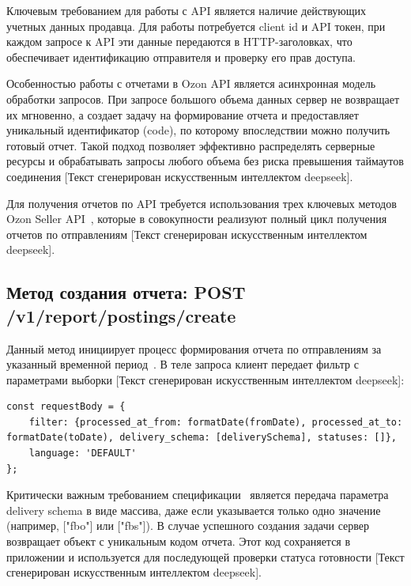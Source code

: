 Ключевым требованием для работы с API является наличие действующих учетных данных продавца. Для работы потребуется client id и API токен, при каждом запросе к API эти данные передаются в HTTP-заголовках, что обеспечивает идентификацию отправителя и проверку его прав доступа.

Особенностью работы с отчетами в Ozon API является асинхронная модель обработки запросов. При запросе большого объема данных сервер не возвращает их мгновенно, а создает задачу на формирование отчета и предоставляет уникальный идентификатор (code), по которому впоследствии можно получить готовый отчет. Такой подход позволяет эффективно распределять серверные ресурсы и обрабатывать запросы любого объема без риска превышения таймаутов соединения [Текст сгенерирован искусственным интеллектом deepseek].

Для получения отчетов по API требуется использования трех ключевых методов Ozon Seller API~\cite{ozonSellerAPI}, которые в совокупности реализуют полный цикл получения отчетов по отправлениям [Текст сгенерирован искусственным интеллектом deepseek].

\subsection{Метод создания отчета: POST /v1/report/postings/create}

Данный метод инициирует процесс формирования отчета по отправлениям за указанный временной период~\cite{ozonSellerAPI}. В теле запроса клиент передает фильтр с параметрами выборки [Текст сгенерирован искусственным интеллектом deepseek]:

\begin{code}
\label{code:filter}
\vspace{-0.75cm}\begin{verbatim}
const requestBody = {
    filter: {processed_at_from: formatDate(fromDate), processed_at_to: formatDate(toDate), delivery_schema: [deliverySchema], statuses: []},
    language: 'DEFAULT'
};
\end{verbatim}
\end{code}

Критически важным требованием спецификации~\cite{ozonSellerAPI} является передача параметра delivery schema в виде массива, даже если указывается только одно значение (например, ["fbo"] или ["fbs"]). В случае успешного создания задачи сервер возвращает объект с уникальным кодом отчета. Этот код сохраняется в приложении и используется для последующей проверки статуса готовности [Текст сгенерирован искусственным интеллектом deepseek].

